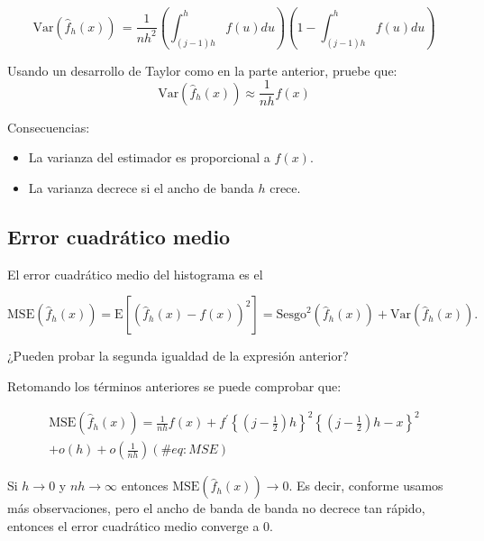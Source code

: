 \documentclass[
  12pt,
]{book}
\providecommand{\tightlist}{%
  \setlength{\itemsep}{0pt}\setlength{\parskip}{0pt}}
\begin{document}
\begin{equation*}
\mathrm{Var}\left( \hat{f}_h(x)\right)\, =
\frac{1}{nh^2} \left(\int_{(j - 1)h}^{h} f(u)du \right)\left( 1 -\int_{(j - 1)h}^{h} f(u)du \right)
\end{equation*}

\leavevmode{}%
Usando un desarrollo de Taylor como en la parte anterior, pruebe que:
\begin{equation*}
\mathrm{Var}\left( \hat{f}_h(x)\right)\approx
\frac{1}{nh} f(x)
\end{equation*}

Consecuencias:

\begin{itemize}
\tightlist
\item
  La varianza del estimador es proporcional a \(f(x)\).
\item
  La varianza decrece si el ancho de banda \(h\) crece.
\end{itemize}

\hypertarget{error-cuadruxe1tico-medio}{%
\subsection{Error cuadrático medio}\label{error-cuadruxe1tico-medio}}

El error cuadrático medio del histograma es el

\begin{equation*}
\mathrm{MSE}\left( \hat{f}_h(x)\right) =
\mathrm{E}\left[\left(\hat{f}_h(x) - f(x)\right)^2\right] = \mathrm{Sesgo}^2\left( \hat{f}_h(x)\right) + \mathrm{Var}\left( \hat{f}_h(x)\right).
\end{equation*}

\leavevmode{}%
¿Pueden probar la segunda igualdad de la expresión anterior?

Retomando los términos anteriores se puede comprobar que:

\begin{align} 
\mathrm{MSE}\left( \hat{f}_h(x)\right) = \frac{1}{nh} f(x) +
f^\prime \left\{ \left( j - \frac{1}{2} \right) h \right\}^2 \left\{ \left( j -
\frac{1}{2} \right) h - x \right\}^2 \\
+ o\left(h \right) +        o\left(\frac{1}{nh} \right)
(\#eq:MSE)
\end{align}

Si \(h \to 0\) y \(nh \to \infty\) entonces
\(\mathrm{MSE}\left( \hat{f}_h(x)\right) \to 0\). Es decir, conforme
usamos más observaciones, pero el ancho de banda de banda no decrece tan
rápido, entonces el error cuadrático medio converge a 0.
\end{document}
